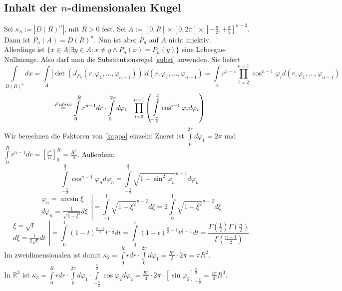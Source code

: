 \documentclass[a4paper,11pt]{scrartcl}
\newcommand{\R}{{\ensuremath{\mathbb{R}}}}
\begin{document}
\subsection{Inhalt der $n$-dimensionalen Kugel}
Sei $\kappa_n:=|D(R)^n|$, mit $R>0$ fest. Sei $A:=[0,R]\times[0,2\pi]\times[-\frac{\pi}{2},+\frac{\pi}{2}]^{n-2}$. Dann ist $P_n(A)=D(R)^n$. Nun ist aber $P_n$ auf $A$ nicht injektiv.\\
Allerdings ist $\{x\in A|\exists y\in A: x\neq y \wedge P_n(x)=P_n(y)\}$ eine Lebesgue-Nullmenge. Also darf man die Substitutionsregel \eqref{subst} anwenden. Sie liefert
\[\int\limits_{D(R)^n}dx=\int\limits_A |\det(J_{P_n}(r,\varphi_1,\ldots,\varphi_{n-1}))|d(r,\varphi_1,\ldots,\varphi_{n-1})=
\int\limits_A r^{n-1}\prod\limits_{i=2}^{n-1}\cos^{n-1}\varphi_i d(r,\varphi_1,\ldots,\varphi_{n-1}) \]
\begin{equation}\label{kappa}\stackrel{Fubini}{=}\int\limits_0^R r^{n-1}dr\cdot\int\limits_0^{2\pi}d\varphi_1\cdot \\ \prod\limits_{i=2}^{n-1}\left(\int\limits_{-\frac{\pi}{2}}^\frac{\pi}{2} \cos^{i-1}\varphi_i d\varphi_i\right)
\end{equation}
Wir berechnen die Faktoren von \eqref{kappa} einzeln:
Zuerst ist $\int\limits_0^{2\pi}d\varphi_1=2\pi$ und $\int\limits_0^R r^{n-1}dr=\left[\frac{r^n}{n}\right]_0^R=\frac{R^n}{n}$. Außerdem:
$$\int\limits_{-\frac{\pi}{2}}^\frac{\pi}{2} \cos^{n-1}\varphi_n d\varphi_n=\int\limits_{-\frac{\pi}{2}}^\frac{\pi}{2} \sqrt{1-\sin^2\varphi_n}^{n-1} d\varphi_n$$
$$\left. \begin{array}{c} \varphi_n= \arcsin \xi \\ d\varphi_n = \frac{1}{\sqrt{1-\xi^2}}d\xi\end{array}\right|
=\int\limits_{-1}^1 \sqrt{1-\xi^2}^{n-2}d\xi=2\int\limits_0^1\sqrt{1-\xi^2}^{n-2}d\xi$$
$$\left. \begin{array}{c} \xi= \sqrt{t} \\ d\xi = \frac{1}{2\sqrt{t}}dt\end{array}\right|
=\int\limits_0^1 (1-t)^\frac{n-2}{2}t^{-\frac{1}{2}}dt = \int\limits_0^1 (1-t)^{\frac{n}{2}-1}t^{\frac{1}{2}-1}dt
=\frac{\Gamma(\frac{1}{2})\Gamma(\frac{n}{2})}{\Gamma(\frac{n+1}{2})}$$
Im zweidimensionalen ist damit $\kappa_2=\int\limits_0^R rdr\cdot \int\limits_0^{2\pi}d\varphi_1 =\frac{R^2}{2}\cdot 2\pi=\pi R^2$.\\
In $\R^3$ ist $\kappa_3=\int\limits_0^R rdr\cdot \int\limits_0^{2\pi}d\varphi_1\cdot \int\limits_{-\frac{\pi}{2}}^\frac{\pi}{2} \cos\varphi_2 d\varphi_2=\frac{R^3}{3}\cdot 2\pi\cdot[\sin\varphi_2]_{-\frac{\pi}{2}}^\frac{\pi}{2}=\frac{4\pi}{3} R^3$.\\
\end{document}
